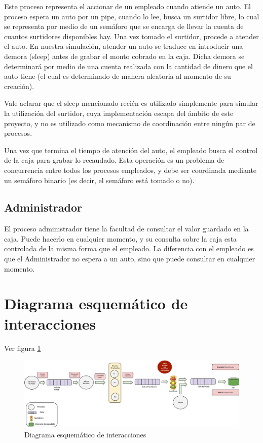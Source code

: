 \documentclass[12pt,a4paper,spanish]{article}
\begin{document}
	Este proceso representa el accionar de un empleado cuando atiende un auto. El proceso espera un auto por un pipe, cuando lo lee, busca un surtidor libre, lo cual se representa por medio de un semáforo que se encarga de llevar la cuenta de cuantos surtidores disponibles hay. Una vez tomado el surtidor, procede a atender el auto. En nuestra simulación, atender un auto se traduce en introducir una demora (sleep) antes de grabar el monto cobrado en la caja. Dicha demora se determinará por medio de una cuenta realizada con la cantidad de dinero que el auto tiene (el cual es determinado de manera aleatoria al momento de su creación). 

	Vale aclarar que el sleep mencionado recién es utilizado simplemente para simular la utilización del surtidor, cuya implementación escapa del ámbito de este proyecto, y no es utilizado como mecanismo de coordinación entre ningún par de procesos.
	
	Una vez que termina el tiempo de atención del auto, el empleado busca el control de la caja para grabar lo recaudado. Esta operación es un problema de concurrencia entre todos los procesos empleados, y debe ser coordinada mediante un semáforo binario (es decir, el semáforo está tomado o no).
	
	\subsection{Administrador}
	
	El proceso administrador tiene la facultad de consultar el valor guardado en la caja. Puede hacerlo en cualquier momento, y su consulta sobre la caja esta controlada de la misma forma que el empleado. La diferencia con el empleado es que el Administrador no espera a un auto, sino que puede consultar en cualquier momento.
	
	\section{Diagrama esquemático de interacciones}
	
	Ver figura \ref{diagrama}

\begin{figure}
\label{diagrama}
\includegraphics[width=1.0\textwidth]{esquema.png}
\caption{Diagrama esquemático de interacciones}
\end{figure}
\end{document}
